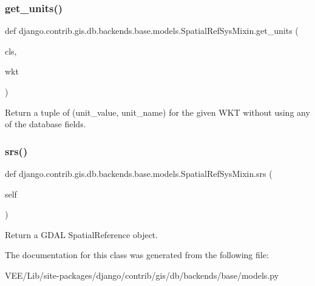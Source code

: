 \subsubsection{\texorpdfstring{get\+\_\+units()}{get\_units()}}
{\footnotesize\ttfamily def django.\+contrib.\+gis.\+db.\+backends.\+base.\+models.\+Spatial\+Ref\+Sys\+Mixin.\+get\+\_\+units (\begin{DoxyParamCaption}\item[{}]{cls,  }\item[{}]{wkt }\end{DoxyParamCaption})}

\begin{DoxyVerb}Return a tuple of (unit_value, unit_name) for the given WKT without
using any of the database fields.
\end{DoxyVerb}
 \mbox{\label{classdjango_1_1contrib_1_1gis_1_1db_1_1backends_1_1base_1_1models_1_1_spatial_ref_sys_mixin_a872cc376b9ec7a9d3e0f5d3529890ef5}} 
\subsubsection{\texorpdfstring{srs()}{srs()}}
{\footnotesize\ttfamily def django.\+contrib.\+gis.\+db.\+backends.\+base.\+models.\+Spatial\+Ref\+Sys\+Mixin.\+srs (\begin{DoxyParamCaption}\item[{}]{self }\end{DoxyParamCaption})}

\begin{DoxyVerb}Return a GDAL SpatialReference object.
\end{DoxyVerb}
 

The documentation for this class was generated from the following file\+:\begin{DoxyCompactItemize}
\item 
V\+E\+E/\+Lib/site-\/packages/django/contrib/gis/db/backends/base/models.\+py\end{DoxyCompactItemize}

